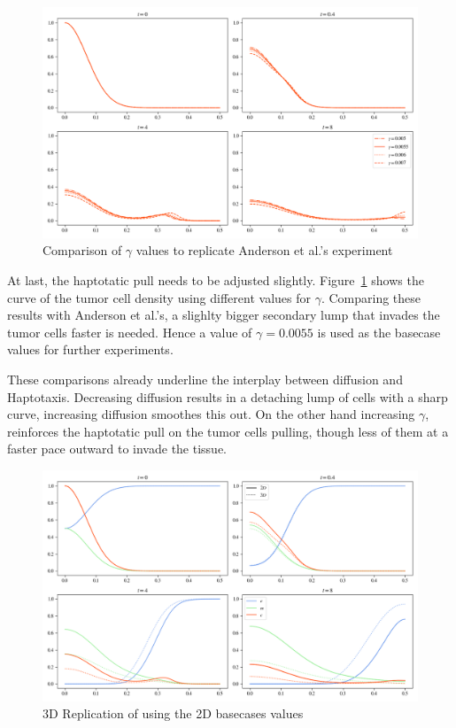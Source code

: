 \begin{figure}[!htb]
 \centering
 \includegraphics[width=\textwidth]{resources/images/gamma_comparison.png}
 \caption{Comparison of $\gamma$ values to replicate Anderson et al.'s experiment}
 \label{fig:replication_gamma_comparison}
\end{figure}

At last, the haptotatic pull needs to be adjusted slightly. Figure~\ref{fig:replication_gamma_comparison} shows the curve of the tumor cell density using different values for $\gamma$. Comparing these results with Anderson et al.'s, a slighlty bigger secondary lump that invades the tumor cells faster is needed. Hence a value of $\gamma=0.0055$ is used as the basecase values for further experiments.

These comparisons already underline the interplay between diffusion and Haptotaxis. Decreasing diffusion results in a detaching lump of cells with a sharp curve, increasing diffusion smoothes this out. On the other hand increasing $\gamma$, reinforces the haptotatic pull on the tumor cells pulling, though less of them at a faster pace outward to invade the tissue.

\begin{figure}[h!]
    \centering
    \includegraphics[width=\textwidth]{resources/images/2D_without_proliferation_replication_3D.png}
    \caption{3D Replication of using the 2D basecases values}
    \label{fig:2D_proliferation_replication_3D}
\end{figure}

